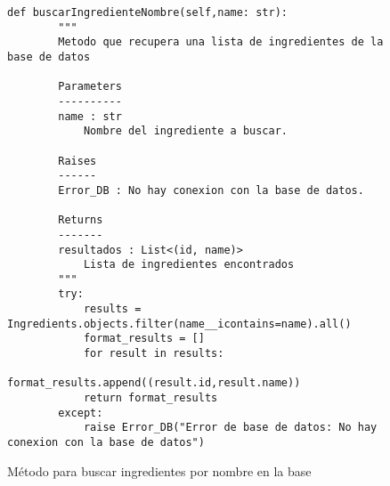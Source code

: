 \begin{figure}[H]
\begin{lstlisting}[style=python]
        def buscarIngredienteNombre(self,name: str):
        """
        Metodo que recupera una lista de ingredientes de la base de datos

        Parameters
        ----------
        name : str
            Nombre del ingrediente a buscar.

        Raises
        ------
        Error_DB : No hay conexion con la base de datos.

        Returns
        -------
        resultados : List<(id, name)>
            Lista de ingredientes encontrados
        """
        try:
            results = Ingredients.objects.filter(name__icontains=name).all()
            format_results = []
            for result in results:
                format_results.append((result.id,result.name))
            return format_results
        except:
            raise Error_DB("Error de base de datos: No hay conexion con la base de datos")
    \end{lstlisting}
    \caption{Método para buscar ingredientes por nombre en la \gls{base}}
    \label{sni:buscarIngredienteNombre}
\end{figure}

